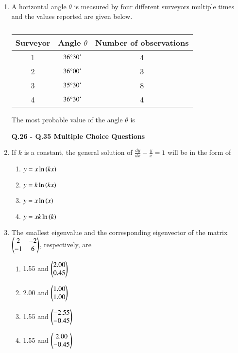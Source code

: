 \documentclass[journal,12pt,onecolumn]{article}
\theoremstyle{remark}
\begin{document}
\begin{enumerate}
\hfill{}

\item A horizontal angle $\theta$ is measured by four different surveyors multiple times and the values reported are given below.
\begin{table}[H]
    \centering
    \begin{tabular}{|c|c|c|}
        \hline
        \textbf{Surveyor} & \textbf{Angle $\theta$} & \textbf{Number of observations} \\ \hline
        1 & $36\degree30'$ & 4 \\ \hline
        2 & $36\degree00'$ & 3 \\ \hline
        3 & $35\degree30'$ & 8 \\ \hline
        4 & $36\degree30'$ & 4 \\ \hline
    \end{tabular}
    \caption{}
    \label{tab:q25}
\end{table}
The most probable value of the angle $\theta$  is \underline{\hspace{2cm}}

\hfill{}

\textbf{Q.26 - Q.35 Multiple Choice Questions}
\item If $k$ is a constant, the general solution of $\frac{dy}{dx} - \frac{y}{x} = 1$ will be in the form of

\hfill{}

\begin{multicols}{2}
\begin{enumerate}
    \item $y = x\ln\left(kx\right)$
    \item $y = k\ln\left(kx\right)$
    \item $y = x\ln\left(x\right)$
    \item $y = xk\ln\left(k\right)$
\end{enumerate}
\end{multicols}

\item The smallest eigenvalue and the corresponding eigenvector of the matrix $\begin{pmatrix}2 & -2 \\ -1 & 6\end{pmatrix}$, respectively, are

\hfill{}

\begin{enumerate}
    \item 1.55 and $\begin{pmatrix}2.00 \\ 0.45\end{pmatrix}$
    \item 2.00 and $\begin{pmatrix}1.00 \\ 1.00\end{pmatrix}$
    \item 1.55 and $\begin{pmatrix}-2.55 \\ -0.45\end{pmatrix}$
    \item 1.55 and $\begin{pmatrix}2.00 \\ -0.45\end{pmatrix}$
\end{enumerate}


\end{enumerate}
\end{document}

